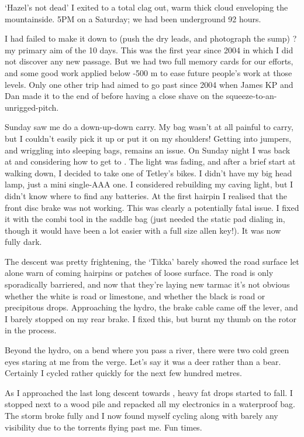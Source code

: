 `Hazel's not dead'
I exited to a total clag out, warm thick cloud enveloping the mountainside.
5PM on a Saturday; we had been underground 92 hours.

I had failed to make it down to  (push the dry leads, and photograph the sump) ? my primary aim of the 10 days. This was the first year since 2004 in which I did not discover any new passage. But we had two full memory cards for our efforts, and some good work applied below -500 m to ease future people's work at those levels. Only one other trip had aimed to go past  since 2004 when James KP and Dan made it to the end of  before having a close shave on the squeeze-to-an-unrigged-pitch.

Sunday saw me do a down-up-down carry. My bag wasn't at all painful to carry, but I couldn't easily pick it up or put it on my shoulders! Getting into jumpers, and wriggling into sleeping bags, remains an issue.
On Sunday night I was back at  and considering how to get to . The light was fading, and after a brief start at walking down, I decided to take one of Tetley's bikes. I didn't have my big head lamp, just a mini single-AAA one. I considered rebuilding my caving light, but I didn't know where to find any batteries.
At the first hairpin I realised that the front disc brake was not working. This was clearly a potentially fatal issue.
I fixed it with the combi tool in the saddle bag (just needed the static pad dialing in, though it would have been a lot easier with a full size allen key!). It was now fully dark.

The descent was pretty frightening, the `Tikka' barely showed the road surface let alone warn of coming hairpins or patches of loose surface. The road is only sporadically barriered, and now that they're laying new tarmac it's not obvious whether the white is road or limestone, and whether the black is road or precipitous drops. Approaching the hydro, the brake cable came off the lever, and I barely stopped on my rear brake. I fixed this, but burnt my thumb on the rotor in the process.

Beyond the hydro, on a bend where you pass a river, there were two cold green eyes staring at me from the verge. Let's say it was a deer rather than a bear. Certainly I cycled rather quickly for the next few hundred metres.

As I approached the last long descent towards , heavy fat drops started to fall. I stopped next to a wood pile and repacked all my electronics in a waterproof bag. The storm broke fully and I now found myself cycling along with barely any visibility due to the torrents flying past me. Fun times.


